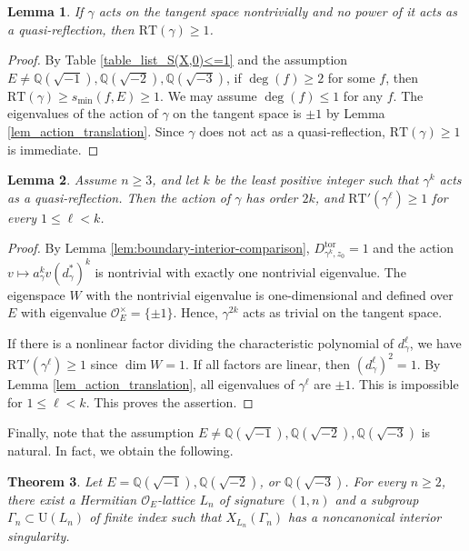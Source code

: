 \documentclass[11pt]{amsart}
\theoremstyle{plain}
\newtheorem{thm}{Theorem}[section]
\newtheorem{lem}[thm]{Lemma}
\theoremstyle{definition}
\numberwithin{equation}{section}
\def\dim{\mathop{\mathrm{dim}}\nolimits}
\def\tor{\mathrm{tor}}
\def\OO{\mathscr{O}}
\def\U{\mathrm{U}}
\newcommand{\bbQ}{\mathbb{Q}}
\begin{document}
\begin{lem}\label{lem_ball_boundary_non-q-ref}
If 
$\gamma$ acts on the tangent space nontrivially and no power of it
acts as a quasi-reflection, then
$\mathrm{RT}(\gamma)\geq1$.
\end{lem}
\begin{proof}
    By Table \ref{table_list_S(X,0)<=1} and the assumption $E \neq \bbQ(\sqrt{-1}),  \bbQ(\sqrt{-2}), \bbQ(\sqrt{-3})$, if $\deg(f) \geq 2$ for some $f$, then $\mathrm{RT}(\gamma) \geq s_{\min}(f,E) \geq 1$.
    We may assume $\deg(f) \leq 1$ for any $f$.
    The eigenvalues of the action of $\gamma$ on the tangent space is $\pm 1$ by Lemma \ref{lem_action_translation}.
    Since $\gamma$ does not act as a quasi-reflection, $\mathrm{RT}(\gamma) \geq 1$ is immediate.
\end{proof}

\begin{lem}\label{lem_ball_boundary_q-ref}
Assume $n\geq3$, and let $k$ be the least positive
integer such that $\gamma^k$ acts as a quasi-reflection.
Then the  action of $\gamma$ has
order $2k$, and
$\mathrm{RT}'(\gamma^\ell)\geq1$
for every $1\leq\ell<k$.
\end{lem}

\begin{proof}
By Lemma \ref{lem:boundary-interior-comparison}, $D_{\gamma^k,z_0}^\tor = 1$ and the action $v \mapsto a_\gamma^k v (d_\gamma^*)^k$ is nontrivial with exactly one nontrivial eigenvalue. 
The eigenspace $W$ with the nontrivial eigenvalue is one-dimensional and defined over $E$ with eigenvalue $\OO_E^\times = \{\pm 1\}$.
Hence, $\gamma^{2k}$ acts as trivial on the tangent space.

If there is a nonlinear factor dividing the characteristic polynomial of $d_\gamma^\ell$, we have $\mathrm{RT}'(\gamma^{\ell}) \geq 1$ since $\dim W = 1$.
If all factors are linear, then
$(d_\gamma^\ell)^2=1$.
By Lemma \ref{lem_action_translation}, all eigenvalues of $\gamma^\ell$ are $\pm1$.
This is impossible for $1\leq\ell<k$.
This proves the assertion.
\end{proof}

Finally, note that the assumption $E\neq\bbQ(\sqrt{-1}),\bbQ(\sqrt{-2}),\bbQ(\sqrt{-3})$ is natural.
In fact, we obtain the following.
\begin{thm}\label{thm:noncanonical-sing-ball-quotient}
Let $E=\bbQ(\sqrt{-1}),\bbQ(\sqrt{-2})$, or
$\bbQ(\sqrt{-3})$.
For every $n\geq2$, there exist a Hermitian $\OO_E$-lattice
$L_n$ of signature $(1,n)$ and a subgroup
$\Gamma_n\subset\U(L_n)$ of finite index such that
$X_{L_n}(\Gamma_n)$ has a noncanonical interior singularity.
\end{thm}
\end{document}
